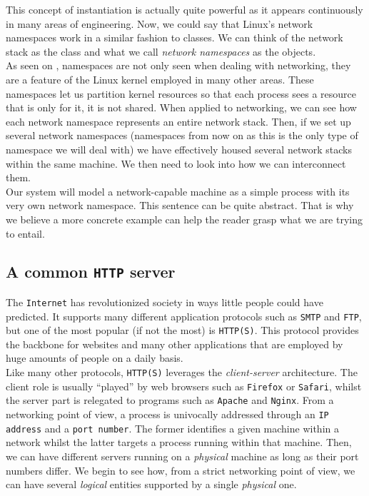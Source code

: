         This concept of instantiation is actually quite powerful as it appears continuously in many areas of engineering. Now, we could say that Linux's network namespaces work in a similar fashion to classes. We can think of the network stack as the class and what we call \textit{network namespaces} as the objects.\\

        As seen on \cite{bib:man-namespaces}, namespaces are not only seen when dealing with networking, they are a feature of the Linux kernel employed in many other areas. These namespaces let us partition kernel resources so that each process sees a resource that is only for it, it is not shared. When applied to networking, we can see how each network namespace represents an entire network stack. Then, if we set up several network namespaces (namespaces from now on as this is the only type of namespace we will deal with) we have effectively housed several network stacks within the same machine. We then need to look into how we can interconnect them.\\

        Our system will model a network-capable machine as a simple process with its very own network namespace. This sentence can be quite abstract. That is why we believe a more concrete example can help the reader grasp what we are trying to entail.\\

        \subsection{A common \texttt{HTTP} server}
            The \texttt{Internet} has revolutionized society in ways little people could have predicted. It supports many different application protocols such as \texttt{SMTP} and \texttt{FTP}, but one of the most popular (if not the most) is \texttt{HTTP(S)}. This protocol provides the backbone for websites and many other applications that are employed by huge amounts of people on a daily basis.\\

            Like many other protocols, \texttt{HTTP(S)} leverages the \textit{client-server} architecture. The client role is usually ``played'' by web browsers such as \texttt{Firefox} or \texttt{Safari}, whilst the server part is relegated to programs such as \texttt{Apache} and \texttt{Nginx}. From a networking point of view, a process is univocally addressed through an \texttt{IP address} and a \texttt{port number}. The former identifies a given machine within a network whilst the latter targets a process running within that machine. Then, we can have different servers running on a \textit{physical} machine as long as their port numbers differ. We begin to see how, from a strict networking point of view, we can have several \textit{logical} entities supported by a single \textit{physical} one.\\


